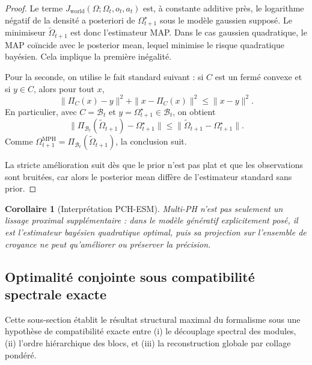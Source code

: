 \documentclass[11pt,a4paper]{article}
\newtheorem{corollary}{Corollaire}[section]
\newcommand{\1}{\mathbf 1}
\begin{document}
\begin{proof}
Le terme \(J_{\mathrm{world}}(\Omega;\Omega_t,o_t,a_t)\) est, à constante additive près, le logarithme négatif de la densité a posteriori de \(\Omega_{t+1}^\star\) sous le modèle gaussien supposé.
Le minimiseur \(\tilde\Omega_{t+1}\) est donc l'estimateur MAP.  
Dans le cas gaussien quadratique, le MAP coïncide avec le posterior mean, lequel minimise le risque quadratique bayésien.
Cela implique la première inégalité.

Pour la seconde, on utilise le fait standard suivant :
si \(C\) est un fermé convexe et si \(y\in C\), alors pour tout \(x\),
\[
\|\Pi_C(x)-y\|^2+\|x-\Pi_C(x)\|^2\le \|x-y\|^2.
\]
En particulier, avec \(C=\mathcal B_t\) et \(y=\Omega_{t+1}^\star\in\mathcal B_t\), on obtient
\[
\|\Pi_{\mathcal B_t}(\tilde\Omega_{t+1})-\Omega_{t+1}^\star\|
\le
\|\tilde\Omega_{t+1}-\Omega_{t+1}^\star\|.
\]
Comme \(\Omega_{t+1}^{\mathrm{MPH}}=\Pi_{\mathcal B_t}(\tilde\Omega_{t+1})\), la conclusion suit.

La stricte amélioration suit dès que le prior n'est pas plat et que les observations sont bruitées, car alors le posterior mean diffère de l'estimateur standard sans prior.
\end{proof}

\begin{corollary}[Interprétation PCH-ESM]
Multi-PH n'est pas seulement un lissage proximal supplémentaire :
dans le modèle génératif explicitement posé, il est l'estimateur bayésien quadratique optimal, puis sa projection sur l'ensemble de croyance ne peut qu'améliorer ou préserver la précision.
\end{corollary}




\subsection{Optimalité conjointe sous compatibilité spectrale exacte}

Cette sous-section établit le résultat structural maximal du formalisme sous une hypothèse de compatibilité exacte entre
(i) le découplage spectral des modules,
(ii) l'ordre hiérarchique des blocs, et
(iii) la reconstruction globale par collage pondéré.
\end{document}
